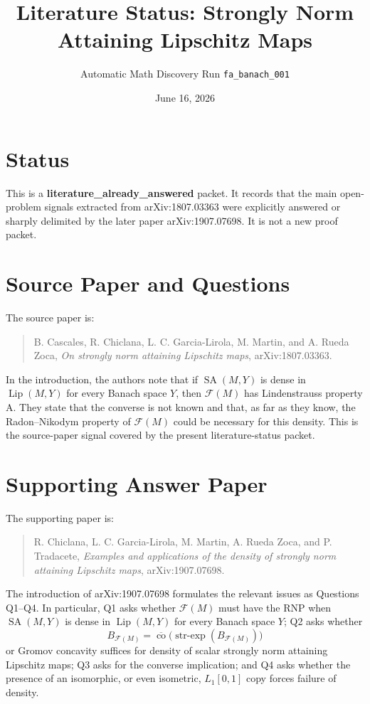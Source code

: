\documentclass[11pt]{article}
\title{Literature Status: Strongly Norm Attaining Lipschitz Maps}
\author{Automatic Math Discovery Run \texttt{fa\_banach\_001}}
\date{June 16, 2026}
\newcommand{\SA}{\operatorname{SA}}
\newcommand{\Lip}{\operatorname{Lip}}
\newcommand{\co}{\operatorname{co}}
\newcommand{\strexp}{\operatorname{str\mbox{-}exp}}
\newcommand{\F}{\mathcal F}
\begin{document}
\maketitle

\section*{Status}

This is a \textbf{literature\_already\_answered} packet.  It records that the
main open-problem signals extracted from arXiv:1807.03363 were explicitly
answered or sharply delimited by the later paper arXiv:1907.07698.  It is not
a new proof packet.

\section*{Source Paper and Questions}

The source paper is:

\begin{quote}
B. Cascales, R. Chiclana, L. C. Garcia-Lirola, M. Martin, and
A. Rueda Zoca,
\emph{On strongly norm attaining Lipschitz maps}, arXiv:1807.03363.
\end{quote}

In the introduction, the authors note that if
\(\SA(M,Y)\) is dense in \(\Lip(M,Y)\) for every Banach space \(Y\), then
\(\F(M)\) has Lindenstrauss property A.  They state that the converse is not
known and that, as far as they know, the Radon--Nikodym property of
\(\F(M)\) could be necessary for this density.  This is the source-paper signal
covered by the present literature-status packet.

\section*{Supporting Answer Paper}

The supporting paper is:

\begin{quote}
R. Chiclana, L. C. Garcia-Lirola, M. Martin, A. Rueda Zoca, and
P. Tradacete,
\emph{Examples and applications of the density of strongly norm attaining
Lipschitz maps}, arXiv:1907.07698.
\end{quote}

The introduction of arXiv:1907.07698 formulates the relevant issues as
Questions Q1--Q4.  In particular, Q1 asks whether \(\F(M)\) must have the RNP
when \(\SA(M,Y)\) is dense in \(\Lip(M,Y)\) for every Banach space \(Y\);
Q2 asks whether
\[
  B_{\F(M)}
  =
  \overline{\co}\bigl(\strexp(B_{\F(M)})\bigr)
\]
or Gromov concavity suffices for density of scalar strongly norm attaining
Lipschitz maps; Q3 asks for the converse implication; and Q4 asks whether the
presence of an isomorphic, or even isometric, \(L_1[0,1]\) copy forces failure
of density.
\end{document}
